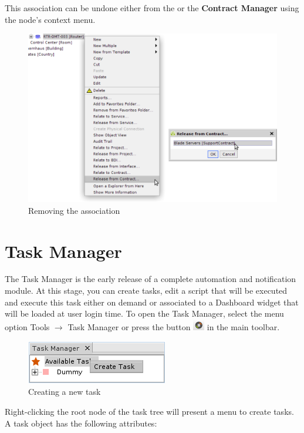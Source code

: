 \documentclass[a4paper]{article}
\begin{document}
		\newpage
		This association can be undone either from the \textbf{} or the \textbf{Contract Manager} using the node's context menu.
		\begin{figure}[h!]
			\centering
			\includegraphics[width=0.6\linewidth]{img/contract_manager_release_from_contract.png}
			\caption{Removing the association}
			\label{fig:contract_manager_release_from_contract}
		\end{figure}
		
	\clearpage
	\section{Task Manager} \label{sec:task_manager}
		The Task Manager is the early release of a complete automation and notification module. At this stage, you can create tasks, edit a script that will be executed and execute this task either on demand or associated to a Dashboard widget that will be loaded at user login time. To open the Task Manager, select the menu option Tools $\rightarrow$ Task Manager or press the button \includegraphics[width=0.5cm]{img/icon_task_manager.png} in the main toolbar.\\
		
		\begin{figure}[h!]
			\centering
			\includegraphics[width=0.3\linewidth]{img/task_manager_create_task.png}
			\caption{Creating a new task}
			\label{fig:task_manager_create_task}
		\end{figure}
		
		Right-clicking the root node of the task tree will present a menu to create tasks. A task object has the following attributes:
		
\end{document}
